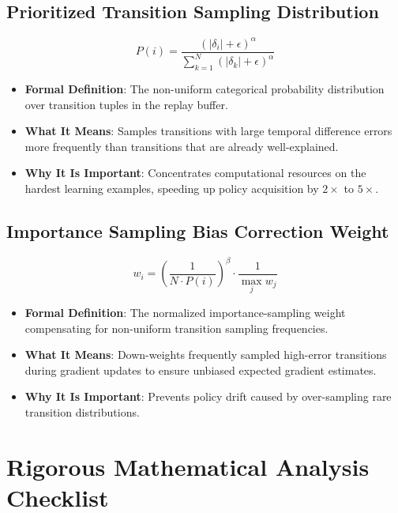 \documentclass[11pt,a4paper]{article}
\theoremstyle{definition}
\begin{document}
\subsection{Prioritized Transition Sampling Distribution}
{\boldmath
\begin{equation}
P(i) = \frac{(|\delta_i| + \epsilon)^\alpha}{\sum_{k=1}^N (|\delta_k| + \epsilon)^\alpha}
\end{equation}
}
\begin{itemize}
    \item \textbf{Formal Definition}: The non-uniform categorical probability distribution over transition tuples in the replay buffer.
    \item \textbf{What It Means}: Samples transitions with large temporal difference errors more frequently than transitions that are already well-explained.
    \item \textbf{Why It Is Important}: Concentrates computational resources on the hardest learning examples, speeding up policy acquisition by $2\times$ to $5\times$.
\end{itemize}

\subsection{Importance Sampling Bias Correction Weight}
{\boldmath
\begin{equation}
w_i = \left( \frac{1}{N \cdot P(i)} \right)^\beta \cdot \frac{1}{\max_j w_j}
\end{equation}
}
\begin{itemize}
    \item \textbf{Formal Definition}: The normalized importance-sampling weight compensating for non-uniform transition sampling frequencies.
    \item \textbf{What It Means}: Down-weights frequently sampled high-error transitions during gradient updates to ensure unbiased expected gradient estimates.
    \item \textbf{Why It Is Important}: Prevents policy drift caused by over-sampling rare transition distributions.
\end{itemize}

\section{Rigorous Mathematical Analysis Checklist}
\end{document}
